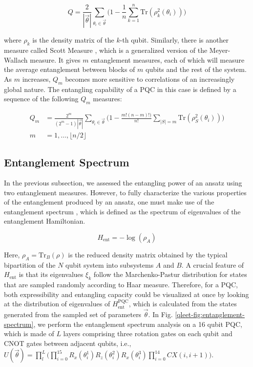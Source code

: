 \begin{equation}
	Q = \frac{2}{|\vec{\theta}|}\sum_{\theta_{i}\in \vec{\theta}}\Bigg(1-\frac{1}{n}\sum_{k=1}^{n}\text{Tr}(\rho_{k}^{2}(\theta_{i}))\Bigg)
\end{equation}

where $\rho_k$ is the density matrix of the $k$-th qubit. Similarly, there is another measure called Scott Measure \cite{10.1007/s11128-007-0052-7}, which is a generalized version of the Meyer-Wallach measure. It gives $m$ entanglement measures, each of which will measure the average entanglement between blocks of $m$ qubits and the rest of the system. As $m$ increases, $Q_m$ becomes more sensitive to correlations of an increasingly global nature. The entangling capability of a PQC in this case is defined by a sequence of the following $Q_m$ measures:


\begin{equation}
    \begin{split}
        Q_{m} &= \frac{2^{m}}{(2^{m}-1) |\vec{\theta}|}\sum_{\theta_i \in \vec{\theta}} \bigg(1 - \frac{m! (n-m)!)}{n!}\sum_{|S|=m} \text{Tr} (\rho_{S}^2 (\theta_i)) \bigg) \\
        m &= 1, \ldots, \lfloor n/2 \rfloor
    \end{split}
\end{equation}


\subsection{Entanglement Spectrum}

In the previous subsection, we assessed the entangling power of an ansatz using two entanglement measures. However, to fully characterize the various properties of the entanglement produced by an ansatz, one must make use of the entanglement spectrum \cite{PhysRevLett.115.267206, PRXQuantum.1.020319}, which is defined as the spectrum of eigenvalues of the entanglement Hamiltonian.

\begin{equation}
    H_{\text{ent}} = -\log (\rho_A)
\end{equation}

Here, $\rho_A = \text{Tr}_B(\rho)$ is the reduced density matrix obtained by the typical bipartition of the $N$ qubit system into subsystems $A$ and $B$. A crucial feature of $H_{\text{ent}}$ is that its eigenvalues $\xi_k$ follow the Marchenko-Pastur distribution \cite{10.1088/1751-8113/40/3/f04} for states that are sampled randomly according to Haar measure. Therefore, for a PQC, both expressibility and entangling capacity could be visualized at once by looking at the distribution of eigenvalues of $H_{\text{ent}}^{\text{PQC}}$, which is calculated from the states generated from the sampled set of parameters $\vec{\theta}$. In Fig. \ref{qleet-fig:entanglement-spectrum}, we perform the entanglement spectrum analysis on a 16 qubit PQC, which is made of $L$ layers comprising three rotation gates on each qubit and CNOT gates between adjacent qubits, i.e., $U(\vec{\theta}) = \prod_{l}^{L}\big(\prod_{i=0}^{15}R_x(\theta_i^1)R_z(\theta_i^2)R_x(\theta_i^3)\prod_{i=0}^{14}CX(i, i+1)\big)$.

